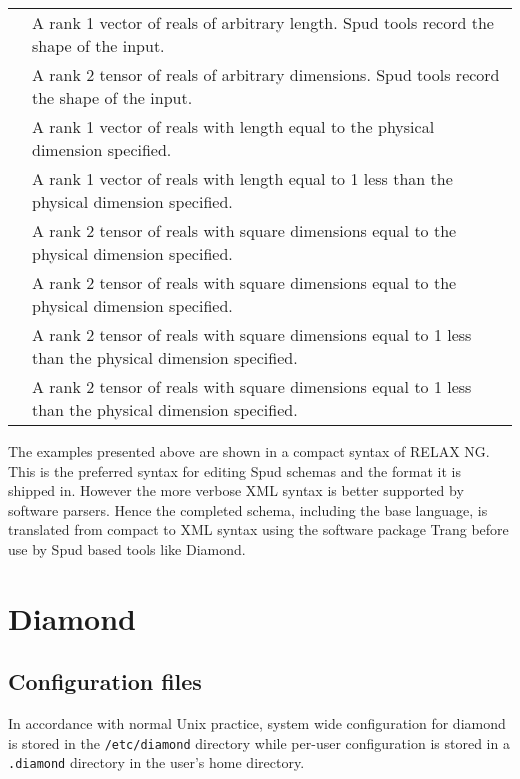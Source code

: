 \documentclass[a4paper, 11pt]{book}
\begin{document}
\begin{tabular}{lp{8cm}}
\lstinline *real_vector* & A rank 1 vector of reals of arbitrary length.  Spud tools record the shape of the input. \\
\lstinline *real_tensor* & A rank 2 tensor of reals of arbitrary dimensions.  Spud tools record the shape of the input. \\
\lstinline *real_dim_vector* & A rank 1 vector of reals with length equal to the physical dimension specified. \\
\lstinline *real_dim_minus_one_vector* & A rank 1 vector of reals with length equal to 1 less than the physical dimension specified. \\
\lstinline *real_dim_tensor* & A rank 2 tensor of reals with square dimensions equal to the physical dimension specified. \\
\lstinline *real_dim_symmetric_tensor* & A rank 2 tensor of reals with square dimensions equal to the physical dimension specified. \\
\lstinline *real_dim_minus_one_tensor* & A rank 2 tensor of reals with square dimensions equal to 1 less than the physical dimension specified. \\
\lstinline *real_dim_minus_one_symmetric_tensor* & A rank 2 tensor of reals with square dimensions equal to 1 less than the physical dimension specified.
\end{tabular}

The examples presented above are shown in a compact syntax of RELAX NG.  This is the preferred syntax for editing Spud schemas and the format it is shipped in.   However the more verbose XML syntax is better supported by software parsers.  Hence the completed schema, including the base language, is translated from compact to XML syntax using the software package Trang before use by Spud based tools like Diamond.

\chapter{Diamond}

\section{Configuration files}

In accordance with normal Unix practice, system wide configuration for
diamond is stored in the \verb+/etc/diamond+ directory while per-user
configuration is stored in a \verb+.diamond+ directory in the user's home
directory.
\end{document}
